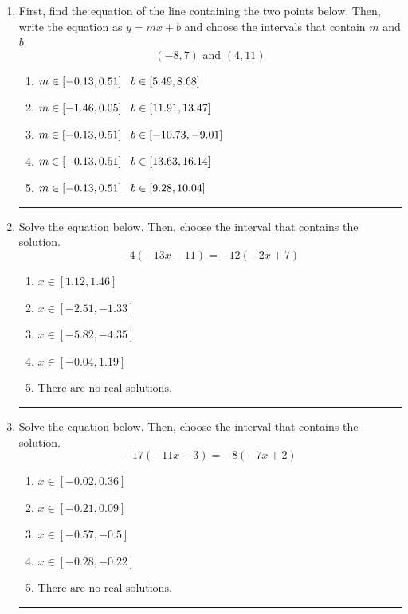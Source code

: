 \documentclass[14pt]{extbook}
\newcommand{\litem}[1]{\item#1\hspace*{-1cm}\rule{\textwidth}{0.4pt}}
\begin{document}
\begin{enumerate}
{\begin{enumerate}[label=\Alph*.]
\end{enumerate} }
\litem{
First, find the equation of the line containing the two points below. Then, write the equation as $ y=mx+b $ and choose the intervals that contain $m$ and $b$.\[ (-8, 7) \text{ and } (4, 11) \]\begin{enumerate}[label=\Alph*.]
\item \( m \in [-0.13, 0.51] \hspace*{3mm} b \in [5.49, 8.68] \)
\item \( m \in [-1.46, 0.05] \hspace*{3mm} b \in [11.91, 13.47] \)
\item \( m \in [-0.13, 0.51] \hspace*{3mm} b \in [-10.73, -9.01] \)
\item \( m \in [-0.13, 0.51] \hspace*{3mm} b \in [13.63, 16.14] \)
\item \( m \in [-0.13, 0.51] \hspace*{3mm} b \in [9.28, 10.04] \)

\end{enumerate} }
\litem{
Solve the equation below. Then, choose the interval that contains the solution.\[ -4(-13x -11) = -12(-2x + 7) \]\begin{enumerate}[label=\Alph*.]
\item \( x \in [1.12, 1.46] \)
\item \( x \in [-2.51, -1.33] \)
\item \( x \in [-5.82, -4.35] \)
\item \( x \in [-0.04, 1.19] \)
\item \( \text{There are no real solutions.} \)

\end{enumerate} }
\litem{
Solve the equation below. Then, choose the interval that contains the solution.\[ -17(-11x -3) = -8(-7x + 2) \]\begin{enumerate}[label=\Alph*.]
\item \( x \in [-0.02, 0.36] \)
\item \( x \in [-0.21, 0.09] \)
\item \( x \in [-0.57, -0.5] \)
\item \( x \in [-0.28, -0.22] \)
\item \( \text{There are no real solutions.} \)


\end{enumerate}}
\end{enumerate}
\end{document}
